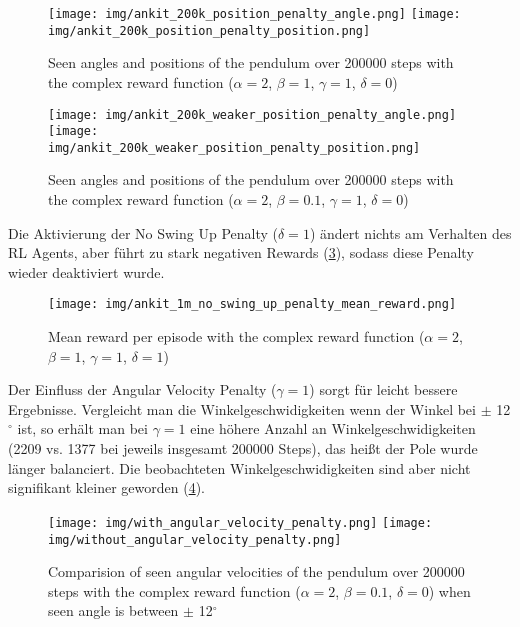 \begin{figure}[htbp]
    \centering
    \texttt{[image: img/ankit\_200k\_position\_penalty\_angle.png]}
    \texttt{[image: img/ankit\_200k\_position\_penalty\_position.png]}
    \caption{Seen angles and positions of the pendulum over 200000 steps with the complex reward function ($\alpha=2$, $\beta=1$, $\gamma=1$, $\delta=0$)}
    \label{fig:angle_position_ankit_200k_position_penalty}
\end{figure}
\begin{figure}[htbp]
    \centering
    \texttt{[image: img/ankit\_200k\_weaker\_position\_penalty\_angle.png]}
    \texttt{[image: img/ankit\_200k\_weaker\_position\_penalty\_position.png]}
    \caption{Seen angles and positions of the pendulum over 200000 steps with the complex reward function ($\alpha=2$, $\beta=0.1$, $\gamma=1$, $\delta=0$)}
    \label{fig:angle_position_ankit_200k_weaker_position_penalty}
\end{figure}
Die Aktivierung der No Swing Up Penalty ($\delta=1$) ändert nichts am Verhalten des RL Agents, aber führt zu stark negativen Rewards (\ref{fig:mean_reward_ankit_1m_no_swing_up_penalty}), sodass diese Penalty wieder deaktiviert wurde.
\begin{figure}[htbp]
    \centering
    \texttt{[image: img/ankit\_1m\_no\_swing\_up\_penalty\_mean\_reward.png]}
    \caption{Mean reward per episode with the complex reward function ($\alpha=2$, $\beta=1$, $\gamma=1$, $\delta=1$)}
    \label{fig:mean_reward_ankit_1m_no_swing_up_penalty}
\end{figure}
Der Einfluss der Angular Velocity Penalty ($\gamma=1$) sorgt für leicht bessere Ergebnisse. Vergleicht man die Winkelgeschwidigkeiten wenn der Winkel bei $\pm$ 12$^\circ$ ist, so erhält man bei $\gamma=1$ eine höhere Anzahl an Winkelgeschwidigkeiten (2209 vs. 1377 bei jeweils insgesamt 200000 Steps), das heißt der Pole wurde länger balanciert. Die beobachteten Winkelgeschwidigkeiten sind aber nicht signifikant kleiner geworden (\ref{fig:filtered_angular_velocity_ankit_200k_compare_angular_velocity_penalty}).
\begin{figure}[htbp]
    \centering
    \texttt{[image: img/with\_angular\_velocity\_penalty.png]}
    \texttt{[image: img/without\_angular\_velocity\_penalty.png]}
    \caption{Comparision of seen angular velocities of the pendulum over 200000 steps with the complex reward function ($\alpha=2$, $\beta=0.1$, $\delta=0$) when seen angle is between $\pm$ 12$^\circ$}
    \label{fig:filtered_angular_velocity_ankit_200k_compare_angular_velocity_penalty}
\end{figure}

